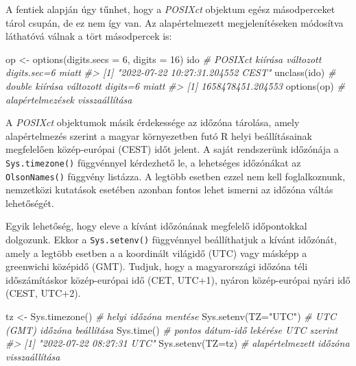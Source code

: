 \documentclass[
]{book}
\newenvironment{Shaded}{\begin{snugshade}}{\end{snugshade}}
\newcommand{\AttributeTok}[1]{\textcolor[rgb]{0.77,0.63,0.00}{#1}}
\newcommand{\CommentTok}[1]{\textcolor[rgb]{0.56,0.35,0.01}{\textit{#1}}}
\newcommand{\DecValTok}[1]{\textcolor[rgb]{0.00,0.00,0.81}{#1}}
\newcommand{\FunctionTok}[1]{\textcolor[rgb]{0.00,0.00,0.00}{#1}}
\newcommand{\NormalTok}[1]{#1}
\newcommand{\OtherTok}[1]{\textcolor[rgb]{0.56,0.35,0.01}{#1}}
\newcommand{\StringTok}[1]{\textcolor[rgb]{0.31,0.60,0.02}{#1}}
\begin{document}
A fentiek alapján úgy tűnhet, hogy a \emph{POSIXct} objektum egész másodperceket tárol csupán, de ez nem így van. Az alapértelmezett megjelenítéseken módosítva láthatóvá válnak a tört másodpercek is:

\begin{Shaded}
\begin{Highlighting}[]
\NormalTok{op }\OtherTok{\textless{}{-}} \FunctionTok{options}\NormalTok{(}\AttributeTok{digits.secs =} \DecValTok{6}\NormalTok{, }\AttributeTok{digits =} \DecValTok{16}\NormalTok{)}
\NormalTok{ido             }\CommentTok{\# POSIXct kiírása változott digits.sec=6 miatt}
\CommentTok{\#\textgreater{} [1] "2022{-}07{-}22 10:27:31.204552 CEST"}
\FunctionTok{unclass}\NormalTok{(ido)    }\CommentTok{\# double kiírása változott digits=6 miatt}
\CommentTok{\#\textgreater{} [1] 1658478451.204553}
\FunctionTok{options}\NormalTok{(op)     }\CommentTok{\# alapértelmezések visszaállítása}
\end{Highlighting}
\end{Shaded}

A \emph{POSIXct} objektumok másik érdekessége az időzóna tárolása, amely alapértelmezés szerint a magyar környezetben futó R helyi beállításainak megfelelően közép-európai (CEST) időt jelent. A saját rendszerünk időzónája a \texttt{Sys.timezone()} függvénnyel kérdezhető le, a lehetséges időzónákat az \texttt{OlsonNames()} függvény listázza. A legtöbb esetben ezzel nem kell foglalkoznunk, nemzetközi kutatások esetében azonban fontos lehet ismerni az időzóna váltás lehetőségét.

Egyik lehetőség, hogy eleve a kívánt időzónának megfelelő időpontokkal dolgozunk. Ekkor a \texttt{Sys.setenv()} függvénnyel beállíthatjuk a kívánt időzónát, amely a legtöbb esetben a a koordinált világidő (UTC) vagy másképp a greenwichi középidő (GMT). Tudjuk, hogy a magyarországi időzóna téli időszámításkor közép-európai idő (CET, UTC+1), nyáron közép-európai nyári idő (CEST, UTC+2).

\begin{Shaded}
\begin{Highlighting}[]
\NormalTok{tz }\OtherTok{\textless{}{-}} \FunctionTok{Sys.timezone}\NormalTok{()  }\CommentTok{\# helyi időzóna mentése}
\FunctionTok{Sys.setenv}\NormalTok{(}\AttributeTok{TZ=}\StringTok{"UTC"}\NormalTok{)  }\CommentTok{\# UTC (GMT) időzóna beállítása}
\FunctionTok{Sys.time}\NormalTok{()            }\CommentTok{\# pontos dátum{-}idő lekérése UTC szerint}
\CommentTok{\#\textgreater{} [1] "2022{-}07{-}22 08:27:31 UTC"}
\FunctionTok{Sys.setenv}\NormalTok{(}\AttributeTok{TZ=}\NormalTok{tz)     }\CommentTok{\# alapértelmezett időzóna visszaállítása}
\end{Highlighting}
\end{Shaded}
\end{document}

